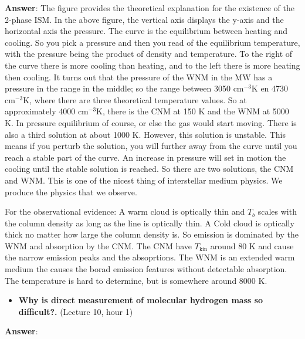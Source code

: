 \documentclass[11pt]{article}
\providecommand{\tightlist}{%
      \setlength{\itemsep}{0pt}\setlength{\parskip}{0pt}}
\begin{document}
    \textbf{Answer}: The figure provides the theoretical explanation for the
existence of the 2-phase ISM. In the above figure, the vertical axis
displays the y-axis and the horizontal axis the pressure. The curve is
the equilibrium between heating and cooling. So you pick a pressure and
then you read of the equilibrium temperature, with the pressure being
the product of density and temperature. To the right of the curve there
is more cooling than heating, and to the left there is more heating then
cooling. It turns out that the pressure of the WNM in the MW has a
pressure in the range in the middle; so the range between 3050
cm\(^{-3}\)K en 4730 cm\(^{-3}\)K, where there are three theoretical
temperature values. So at approximately 4000 cm\(^{-3}\)K, there is the
CNM at 150 K and the WNM at 5000 K. In pressure equilibrium of course,
or else the gas would start moving. There is also a third solution at
about 1000 K. However, this solution is unstable. This means if you
perturb the solution, you will further away from the curve until you
reach a stable part of the curve. An increase in pressure will set in
motion the cooling until the stable solution is reached. So there are
two solutions, the CNM and WNM. This is one of the nicest thing of
interstellar medium physics. We produce the physics that we observe.

For the observational evidence: A warm cloud is optically thin and
\(T_b\) scales with the column density as long as the line is optically
thin. A Cold cloud is optically thick no matter how large the column
density is. So emission is dominated by the WNM and absorption by the
CNM. The CNM have \(T_\text{kin}\) around 80 K and cause the narrow
emission peaks and the absoprtions. The WNM is an extended warm medium
the causes the borad emission features without detectable absorption.
The temperature is hard to determine, but is somewhere around 8000 K.

    \begin{itemize}
\tightlist
\item
  \textbf{Why is direct measurement of molecular hydrogen mass so
  difficult?.} (Lecture 10, hour 1)
\end{itemize}

\textbf{Answer}:


    
    
    
    
\end{document}

